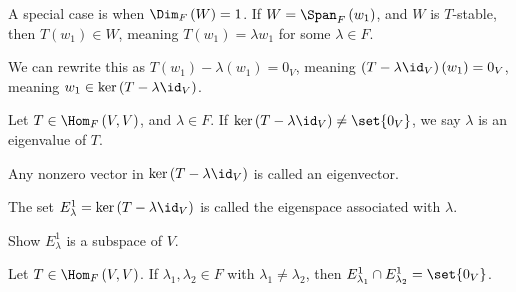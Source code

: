 \documentclass[10pt]{mypackage}
\begin{document}
A special case is when $\Dim_{F}\left(W\right) = 1$. If $W = \Span_{F}\left(w_1\right)$, and $W$ is $T$-stable, then $T\left(w_1\right) \in W$, meaning $T\left(w_1\right) = \lambda w_1$ for some $\lambda \in F$.\newline

We can rewrite this as $T\left(w_1\right) - \lambda\left(w_1\right) = 0_V$, meaning $\left(T - \lambda \id_V\right)\left(w_1\right) = 0_V$, meaning $w_1\in \ker\left(T - \lambda\id_V\right)$.
\begin{definition}
  Let $T\in \Hom_{F}\left(V,V\right)$, and $\lambda \in F$. If $\ker\left(T - \lambda\id_V\right) \neq \set{0_V}$, we say $\lambda$ is an eigenvalue of $T$.\newline

  Any nonzero vector in $\ker\left(T - \lambda \id_V\right)$ is called an eigenvector.\newline

  The set $E^{1}_{\lambda} = \ker\left(T - \lambda \id_V\right)$ is called the eigenspace associated with $\lambda$.
\end{definition}
\begin{exercise}
  Show $E^{1}_{\lambda}$ is a subspace of $V$.
\end{exercise}
\begin{exercise}
  Let $T\in \Hom_{F}\left(V,V\right)$. If $\lambda_1,\lambda_2 \in F$ with $\lambda_1\neq \lambda_2$, then $E^{1}_{\lambda_1} \cap E^{1}_{\lambda_2} = \set{0_V}$.
\end{exercise}
\end{document}
